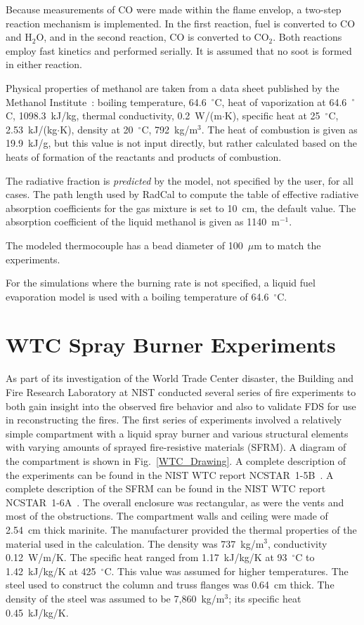 Because measurements of CO were made within the flame envelop, a two-step reaction mechanism is implemented. In the first reaction, fuel is converted to CO and H$_2$O, and in the second reaction, CO is converted to CO$_2$. Both reactions employ fast kinetics and performed serially. It is assumed that no soot is formed in either reaction.

Physical properties of methanol are taken from a data sheet published by the Methanol Institute~\cite{Methanol}: boiling temperature, 64.6~$^\circ$C, heat of vaporization at 64.6~$^\circ$C, 1098.3~kJ/kg, thermal conductivity, 0.2~W/(m$\cdot$K), specific heat at 25~$^\circ$C, 2.53~kJ/(kg$\cdot$K), density at 20~$^\circ$C, 792~kg/m$^3$. The heat of combustion is given as 19.9~kJ/g, but this value is not input directly, but rather calculated based on the heats of formation of the reactants and products of combustion.

The radiative fraction is {\em predicted} by the model, not specified by the user, for all cases. The path length used by RadCal to compute the table of effective radiative absorption coefficients for the gas mixture is set to 10~cm, the default value. The absorption coefficient of the liquid methanol is given as 1140~m$^{-1}$.

The modeled thermocouple has a bead diameter of 100~$\mu$m to match the experiments.

For the simulations where the burning rate is not specified, a liquid fuel evaporation model is used with a boiling temperature of 64.6~$^\circ$C.


\section{WTC Spray Burner Experiments}
\label{WTC_Description}

As part of its investigation of the World Trade Center disaster, the Building and Fire Research Laboratory at NIST conducted several series of fire experiments to both gain insight into the observed fire behavior and also to validate FDS for use in reconstructing the fires. The first series of experiments involved a relatively simple compartment with a liquid spray burner and various structural elements with varying amounts of sprayed fire-resistive materials (SFRM). A diagram of the compartment is shown in Fig.~\ref{WTC_Drawing}. A complete description of the experiments can be found in the NIST WTC report NCSTAR~1-5B~\cite{NIST_NCSTAR_1-5B}. A complete description of the SFRM can be found in the NIST WTC report NCSTAR~1-6A~\cite{NIST_NCSTAR_1-6A}. The overall enclosure was rectangular, as were the vents and most of the obstructions. The compartment walls and ceiling were made of 2.54~cm thick marinite. The manufacturer provided the thermal properties of the material used in the calculation. The density was 737~kg/m$^3$, conductivity 0.12~W/m/K. The specific heat ranged from 1.17~kJ/kg/K at 93~$^\circ$C to 1.42~kJ/kg/K at 425~$^\circ$C. This value was assumed for higher temperatures. The steel used to construct the column and truss flanges was 0.64~cm thick.  The density of the steel was assumed to be 7,860~kg/m$^3$; its specific heat 0.45~kJ/kg/K.

